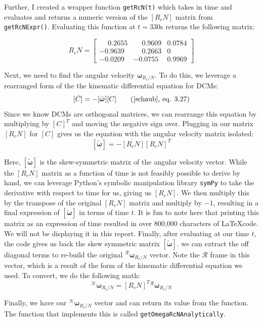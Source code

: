\documentclass[conf]{new-aiaa}
\begin{document}
Further, I created a wrapper function \texttt{getRcN(t)} which takes in time and evaluates and returns a numeric version of the $[R_cN]$ matrix from \texttt{getRcNExpr()}. Evaluating this function at $t=330$s returns the following matrix:

\[
R_cN =
\begin{bmatrix}
\phantom{-}0.2655 & \phantom{-}0.9609 & 0.0784 \\
-0.9639 & \phantom{-}0.2663 & 0 \\
-0.0209 & -0.0755 & 0.9969
\end{bmatrix}
\]

Next, we need to find the angular velocity $\bm{\omega}_{R_c/N}$. To do this, we leverage a rearranged form of the the kinematic differential equation for DCMs:
\[
[\dot C] = -[\tilde{\bm\omega}][C] \tag{\cite{schaub},~eq. 3.27}
\]
Since we know DCMs are orthogonal matrices, we can rearrange this equation by multiplying by $[C]^T$ and moving the negative sign over. Plugging in our matrix $[R_cN]$ for $[C]$ gives us the equation with the angular velocity matrix isolated:
\[
[\tilde{\bm{\omega}}] = -\dot{[R_cN]}[R_cN]^T
\]

Here, $[\tilde{\bm{\omega}}]$ is the skew-symmetric matrix of the angular velocity vector. While the $[R_cN]$ matrix as a function of time is not feasibly possible to derive by hand, we can leverage Python's symbolic manipulation library \texttt{symPy} to take the derivative with respect to time for us, giving us $\dot{[R_cN]}$. We then multiply this by the transpose of the original $[R_cN]$ matrix and multiply by $-1$, resulting in a final expression of $[\tilde{\bm{\omega}}]$ in terms of time $t$. It is fun to note here that printing this matrix as an expression of time resulted in over 800,000 characters of \LaTeX code. We will not be displaying it in this report. Finally, after evaluating at our time $t$, the code gives us back the skew symmetric matrix $[\tilde{\bm\omega}]$. we can extract the off diagonal terms to re-build the original ${}^{\mathcal{R}}\bm{\omega}_{R_c/N}$ vector. Note the $\mathcal{R}$ frame in this vector, which is a result of the form of the kinematic differential equation we used. To convert, we do the following math:
\[
{}^{\mathcal{N}}\bm{\omega}_{R_c/N} = [R_cN]^T{}^{\mathcal{R}}\bm{\omega}_{R_c/N}
\]

Finally, we have our ${}^{\mathcal{N}}\bm{\omega}_{R_c/N}$ vector and can return its value from the function. The function that implements this is called \texttt{getOmegaRcNAnalytically}.
\end{document}
